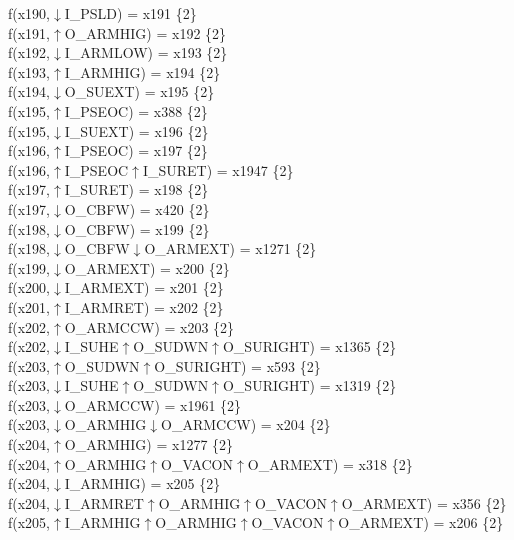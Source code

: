 f(x190,$\downarrow$I\_PSLD) = x191 \{2\} \\  
f(x191,$\uparrow$O\_ARMHIG) = x192 \{2\} \\  
f(x192,$\downarrow$I\_ARMLOW) = x193 \{2\} \\  
f(x193,$\uparrow$I\_ARMHIG) = x194 \{2\} \\  
f(x194,$\downarrow$O\_SUEXT) = x195 \{2\} \\  
f(x195,$\uparrow$I\_PSEOC) = x388 \{2\} \\  
f(x195,$\downarrow$I\_SUEXT) = x196 \{2\} \\  
f(x196,$\uparrow$I\_PSEOC) = x197 \{2\} \\  
f(x196,$\uparrow$I\_PSEOC$\uparrow$I\_SURET) = x1947 \{2\} \\  
f(x197,$\uparrow$I\_SURET) = x198 \{2\} \\  
f(x197,$\downarrow$O\_CBFW) = x420 \{2\} \\  
f(x198,$\downarrow$O\_CBFW) = x199 \{2\} \\  
f(x198,$\downarrow$O\_CBFW$\downarrow$O\_ARMEXT) = x1271 \{2\} \\  
f(x199,$\downarrow$O\_ARMEXT) = x200 \{2\} \\  
f(x200,$\downarrow$I\_ARMEXT) = x201 \{2\} \\  
f(x201,$\uparrow$I\_ARMRET) = x202 \{2\} \\  
f(x202,$\uparrow$O\_ARMCCW) = x203 \{2\} \\  
f(x202,$\downarrow$I\_SUHE$\uparrow$O\_SUDWN$\uparrow$O\_SURIGHT) = x1365 \{2\} \\  
f(x203,$\uparrow$O\_SUDWN$\uparrow$O\_SURIGHT) = x593 \{2\} \\  
f(x203,$\downarrow$I\_SUHE$\uparrow$O\_SUDWN$\uparrow$O\_SURIGHT) = x1319 \{2\} \\  
f(x203,$\downarrow$O\_ARMCCW) = x1961 \{2\} \\  
f(x203,$\downarrow$O\_ARMHIG$\downarrow$O\_ARMCCW) = x204 \{2\} \\  
f(x204,$\uparrow$O\_ARMHIG) = x1277 \{2\} \\  
f(x204,$\uparrow$O\_ARMHIG$\uparrow$O\_VACON$\uparrow$O\_ARMEXT) = x318 \{2\} \\  
f(x204,$\downarrow$I\_ARMHIG) = x205 \{2\} \\  
f(x204,$\downarrow$I\_ARMRET$\uparrow$O\_ARMHIG$\uparrow$O\_VACON$\uparrow$O\_ARMEXT) = x356 \{2\} \\  
f(x205,$\uparrow$I\_ARMHIG$\uparrow$O\_ARMHIG$\uparrow$O\_VACON$\uparrow$O\_ARMEXT) = x206 \{2\} \\  
